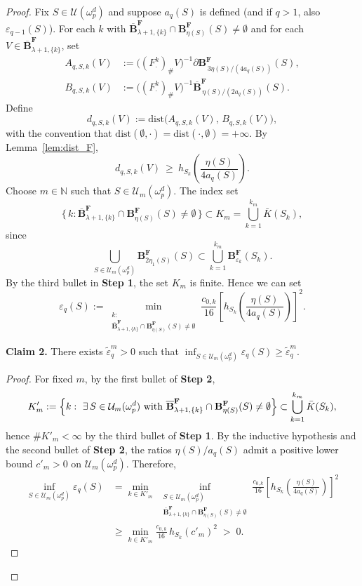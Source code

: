 \documentclass[12pt,english]{article}
\theoremstyle{definition}
\begin{document}
\begin{proof}
Fix $S\in\mathcal{U}(\omega^d_p)$ and suppose $a_q(S)$ is defined (and if $q>1$, also $\varepsilon_{q-1}(S)$). For each \(k\) with \(\overline{\mathbf{B}}^{\mathbf F}_{\lambda+1,\{k\}}\cap \mathbf{B}^{\mathbf F}_{\eta(S)}(S)\neq\emptyset\) and for each \(V\in\overline{\mathbf{B}}^{\mathbf F}_{\lambda+1,\{k\}}\), set
\[
\begin{aligned}
A_{q,S,k}(V)&:=\bigl((F^k_{\cdot})_{\#}V\bigr)^{-1}\partial\mathbf{B}^{\mathbf F}_{\,3\eta(S)/(4a_q(S))}(S),\\
B_{q,S,k}(V)&:=\bigl((F^k_{\cdot})_{\#}V\bigr)^{-1}\overline{\mathbf{B}}^{\mathbf F}_{\,\eta(S)/(2a_q(S))}(S).
\end{aligned}
\]
Define
\[
d_{q,S,k}(V):=\mathrm{dist}\bigl(A_{q,S,k}(V),\,B_{q,S,k}(V)\bigr),
\]
with the convention that \(\mathrm{dist}(\emptyset,\cdot)=\mathrm{dist}(\cdot,\emptyset)=+\infty\). By Lemma~\ref{lem:dist_F},
\[
    d_{q,S,k}(V)\ \ge\ h_{S_k}\!\left(\frac{\eta(S)}{4a_q(S)}\right).
\]
Choose $m \in \mathbb{N}$ such that $S \in \mathcal{U}_m(\omega^d_p)$. The index set
\[
    \{\,k : \overline{\mathbf{B}}^\mathbf{F}_{\lambda+1,\{k\}}\cap \mathbf{B}^\mathbf{F}_{\eta(S)}(S)\neq\emptyset\,\}
    \subset K_m=\bigcup_{k=1}^{k_m}\bar K(S_k),
\]
since
\[\displaystyle \bigcup_{S\in\mathcal{U}_m(\omega^d_p)}\mathbf{B}^\mathbf{F}_{2\eta_1(S)}(S)\subset \bigcup_{k=1}^{k_m}\mathbf{B}^\mathbf{F}_{\varepsilon_k}(S_k).\]
By the third bullet in \textbf{Step 1}, the set \(K_m\) is finite. Hence we can set
\begin{equation}\label{eq:def-eps}
    \varepsilon_q(S):=\min_{\substack{k:\\ \overline{\mathbf{B}}^{\mathbf F}_{\lambda+1,\{k\}}\cap \mathbf{B}^{\mathbf F}_{\eta(S)}(S)\neq\emptyset}}
    \frac{c_{0,k}}{16}\left[h_{S_k}\!\left(\frac{\eta(S)}{4a_q(S)}\right)\right]^2.
\end{equation}

\textbf{Claim 2.} There exists $\tilde\varepsilon^m_q>0$ such that $\inf_{S\in\mathcal{U}_m(\omega^d_p)}\varepsilon_q(S)\ge \tilde\varepsilon^m_q$.
\begin{proof}
For fixed $m$, by the first bullet of \textbf{Step 2},
\[
K'_m:=\Bigl\{k:\ \exists\,S\in\mathcal{U}_m(\omega^d_p)\ \text{with}\ \overline{\mathbf{B}}^{\mathbf F}_{\lambda+1,\{k\}}\cap \mathbf{B}^{\mathbf F}_{\eta(S)}(S)\neq\emptyset\Bigr\}
\subset \bigcup_{k=1}^{k_m}\bar K(S_k),
\]
hence $\#K'_m<\infty$ by the third bullet of \textbf{Step 1}. By the inductive hypothesis and the second bullet of \textbf{Step 2}, the ratios $\eta(S)/a_q(S)$ admit a positive lower bound $c'_m>0$ on $\mathcal{U}_m(\omega^d_p)$. Therefore,
\[
\begin{aligned}
\inf_{S\in\mathcal{U}_m(\omega^d_p)}\varepsilon_q(S)
&= \min_{k\in K'_m}\ 
\inf_{\substack{S\in\mathcal{U}_m(\omega^d_p)\\
\overline{\mathbf{B}}^{\mathbf F}_{\lambda+1,\{k\}}
\cap \mathbf{B}^{\mathbf F}_{\eta(S)}(S)\neq\emptyset}}
\frac{c_{0,k}}{16}\left[h_{S_k}\!\left(\frac{\eta(S)}{4a_q(S)}\right)\right]^2 \\
&\ge \min_{k\in K'_m}\frac{c_{0,k}}{16}\,h_{S_k}(c'_m)^2 \;>\; 0.
\end{aligned}
\]
\end{proof}


\end{proof}
\end{document}

